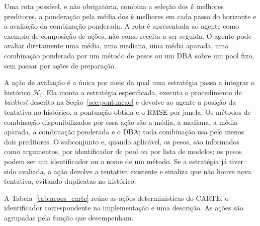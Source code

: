 Uma rota possível, e não obrigatória, combina a seleção dos $k$ melhores preditores, a ponderação pela média dos $k$ melhores em cada passo do horizonte e a avaliação da combinação ponderada. A rota é apresentada ao agente como exemplo de composição de ações, não como receita a ser seguida. O agente pode avaliar diretamente uma média, uma mediana, uma média aparada, uma combinação ponderada por um método de pesos ou um DBA sobre um pool fixo, sem passar por ações de preparação.

A ação de avaliação é a única por meio da qual uma estratégia passa a integrar o histórico $\mathcal{H}_i$. Ela monta a estratégia especificada, executa o procedimento de \textit{backtest} descrito na Seção~\ref{sec:pontuacao} e devolve ao agente a posição da tentativa no histórico, a pontuação obtida e o RMSE por janela. Os métodos de combinação disponibilizados por essa ação são a média, a mediana, a média aparada, a combinação ponderada e o DBA; toda combinação usa pelo menos dois preditores. O subconjunto e, quando aplicável, os pesos, são informados como argumentos, por identificador de pool ou por lista de modelos; os pesos podem ser um identificador ou o nome de um método. Se a estratégia já tiver sido avaliada, a ação devolve a tentativa existente e sinaliza que não houve nova tentativa, evitando duplicatas no histórico.

A Tabela~\ref{tab:acoes_carte} reúne as ações determinísticas do CARTE, o identificador correspondente na implementação e uma descrição. As ações são agrupadas pela função que desempenham.

